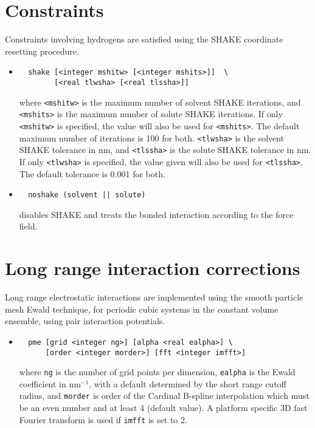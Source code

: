 \section{Constraints}
Constraints involving hydrogens are satisfied using the SHAKE 
coordinate resetting procedure.
\begin{itemize}
\item
\begin{verbatim}
  shake [<integer mshitw> [<integer mshits>]]  \
        [<real tlwsha> [<real tlssha>]]
\end{verbatim}
where \verb+<mshitw>+ is the maximum number of solvent SHAKE iterations,
and \verb+<mshits>+ is the maximum number of solute SHAKE iterations. If
only \verb+<mshitw>+ is specified, the value will also be used for \verb+<mshits>+.
The default maximum number of iterations is 100 for both.
\verb+<tlwsha>+ is the solvent SHAKE tolerance in nm, and \verb+<tlssha>+ is
the solute SHAKE tolerance in nm. If only \verb+<tlwsha>+ is specified, the
value given will also be used for \verb+<tlssha>+. The default tolerance
is 0.001 for both.
\item
\begin{verbatim}
  noshake (solvent || solute)
\end{verbatim}
disables SHAKE and treats the bonded interaction according to the
force field.
\end{itemize}

\section{Long range interaction corrections}
Long range electrostatic interactions are implemented using the
smooth particle mesh Ewald technique, for periodic cubic systems in
the constant volume ensemble, using pair interaction potentials.
\begin{itemize}
\item
\begin{verbatim}
  pme [grid <integer ng>] [alpha <real ealpha>] \
      [order <integer morder>] [fft <integer imfft>] 
\end{verbatim}
where \verb+ng+ is the number of grid points per dimension, 
\verb+ealpha+ is the Ewald coefficient in nm$^{-1}$, with a default
determined by the short range cutoff radius, 
and \verb+morder+ is order of the Cardinal B-spline
interpolation which must be an even number and at least 4 (default
value). A platform specific 3D fast Fourier transform is used if
\verb+imfft+ is set to 2.
\end{itemize}

